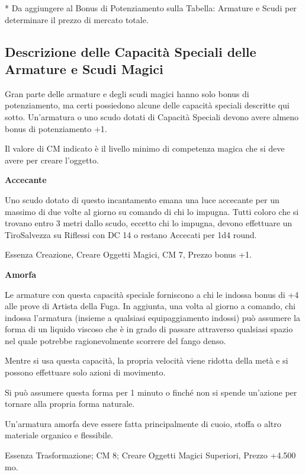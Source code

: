 \documentclass[a4paper,11pt,twoside,openany]{book}
\begin{document}
{{*} Da aggiungere al Bonus di Potenziamento sulla Tabella: Armature
e Scudi per determinare il prezzo di mercato totale.



\subsection{Descrizione delle Capacità Speciali delle Armature e Scudi Magici}

\label{descrizione-delle-capacita-speciali-delle-armature-e-scudi-magici}

Gran parte delle armature e degli scudi magici hanno solo bonus di potenziamento, ma certi possiedono alcune delle capacità speciali descritte qui sotto. Un'armatura o uno scudo dotati di Capacità Speciali devono avere almeno bonus di potenziamento +1.

Il valore di CM indicato è il livello minimo di competenza magica che si deve avere per creare l'oggetto.

\textbf{Accecante}

Uno scudo dotato di questo incantamento emana una luce accecante per un massimo di due volte al giorno su comando di chi lo impugna. Tutti coloro che si trovano entro 3 metri dallo scudo, eccetto chi lo impugna, devono effettuare un TiroSalvezza su Riflessi con DC 14 o restano Accecati per 1d4 round.

Essenza Creazione, Creare Oggetti Magici, CM 7, Prezzo bonus +1.

\textbf{Amorfa}

Le armature con questa capacità speciale forniscono a chi le indossa bonus di +4 alle prove di Artista della Fuga. In aggiunta, una volta al giorno a comando, chi indossa l'armatura (insieme a qualsiasi equipaggiamento indossi) può assumere la forma di un liquido viscoso che è in grado di passare attraverso qualsiasi spazio nel quale potrebbe ragionevolmente scorrere del fango denso.

Mentre si usa questa capacità, la propria velocità viene ridotta della metà e si possono effettuare solo azioni di movimento.

Si può assumere questa forma per 1 minuto o finché non si spende un'azione per tornare alla propria forma naturale.

Un'armatura amorfa deve essere fatta principalmente di cuoio, stoffa o altro materiale organico e flessibile.

Essenza Trasformazione; CM 8; Creare Oggetti Magici Superiori, Prezzo
+4.500 mo.

}
\end{document}
